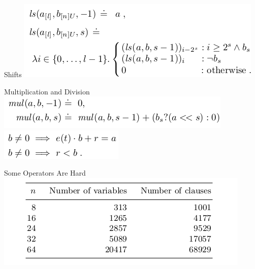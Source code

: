 \documentclass{beamer}
\begin{document}
\begin{frame}{Shifts}
\includegraphics[scale=0.5]{ls.png}\newline
\end{frame}

\begin{frame}{Multiplication and Division}
\includegraphics[scale=0.5]{mul1.png}\newline
\includegraphics[scale=0.5]{div.png}\newline
\end{frame}

\begin{frame}{Some Operators Are Hard}
\includegraphics[scale=0.5]{Size.png}\newline
\end{frame}
\end{document}
